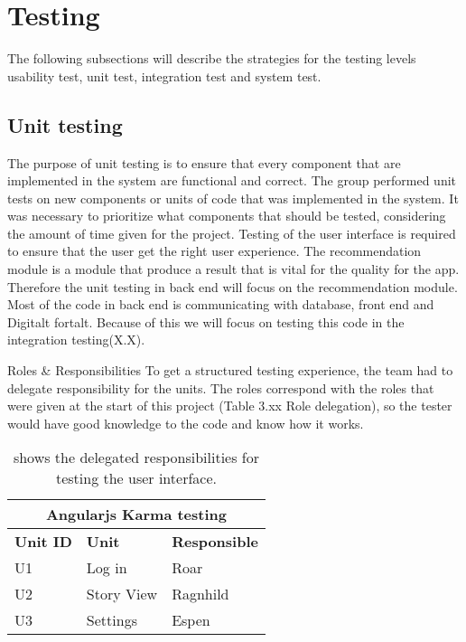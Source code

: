 
\chapter{Testing}

The following subsections will describe the strategies for the testing levels usability test, unit test, integration test and system test. 

\section{Unit testing}

The purpose of unit testing is to ensure that every component that are implemented in the system are functional and correct. The group performed unit tests on new components or units of code that was implemented in the system. It was necessary to prioritize what components that should be tested, considering the amount of time given for the project. Testing of the user interface is required to ensure that the user get the right user experience. The recommendation module is a module that produce a result that is vital for the quality for the app. Therefore the unit testing in back end will focus on the recommendation module. Most of the code in back end is communicating with database, front end and Digitalt fortalt. Because of this we will focus on testing this code in the integration testing(X.X).\newline

Roles \& Responsibilities\newline
To get a structured testing experience, the team had to delegate responsibility for the units. The roles correspond with the roles that were given at the start of this project (Table 3.xx Role delegation), so the tester would have good knowledge to the code and know how it works.  

\begin{table}[!h]
	\begin{center}
		\begin{tabular}{ | l | l | l |}
			\hline
			\multicolumn{3}{|c|}{\textbf{Angularjs Karma testing}} \\
			\hline
			\textbf{Unit ID} & \textbf{Unit} & \textbf{Responsible} \\ \hline
			U1 & Log in & Roar \\ \hline
			U2 & Story View & Ragnhild \\ \hline
			U3 & Settings & Espen \\ \hline
		\end{tabular}
	\end{center}
	\caption{shows the delegated responsibilities for testing the user interface.}
	\label{Tab_karmatesting}
\end{table}


